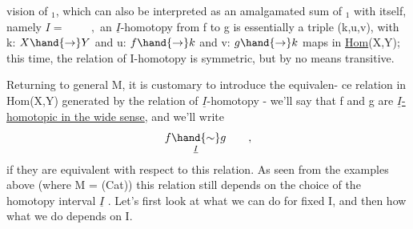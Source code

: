 vision of \hand{$\Delta$}$_1$, which can also be interpreted as an amalgamated
sum of \hand{$\Delta$}$_1$ with itself, namely
$I = $  $\qquad ,$
an $\underline{I}$-homotopy from f to g is essentially a triple (k,u,v), with
k: $X \hand{\ensuremath{\to}} Y$ and u: $f \hand{\ensuremath{\to}} k$ and v: $g \hand{\ensuremath{\to}} k$ maps in \uline{Hom}(X,Y); this time, the
relation of I-homotopy is symmetric, but by no means transitive.

Returning to general M, it is customary to introduce the equivalen-%
ce relation in Hom(X,Y) generated by the relation of $\underline{I}$-homotopy - we'll
say that f and g are \uline{$\underline{I}$-homotopic in the wide sense}, and we'll write
\[ f \underset{\underline{I}}{\hand{\ensuremath{\sim}}} g \qquad , \]
if they are equivalent with respect to this relation. As seen from the 
 examples above (where M = (Cat))\hand{,} this relation still depends on
the choice of the homotopy interval $\underline{I}$ . Let's first look at what we can
do for fixed I, and then how what we do depends on I.

